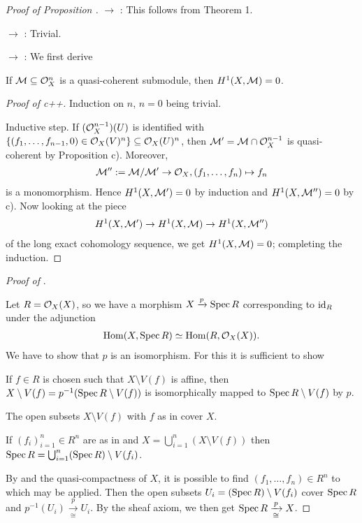 \documentclass[a4paper,parskip=half,numbers=enddot, DIV=12]{scrreprt}
\begin{document}
\begin{proof}[Proof of Proposition ]
 $\rightarrow$ : This follows from Theorem 1.

 $\rightarrow$ : Trivial.

 $\rightarrow$ : We first derive
\begin{fact*}[c++]
If $\mathcal{M}\subseteq \mathcal{O}_X^n$ is a quasi-coherent submodule, then $H^1(X,\mathcal{M})=0$.
\end{fact*}
\begin{proof}[Proof of c++]
Induction on $n$, $n=0$ being trivial.

Inductive step. If $(\mathcal{O}_X^{n-1})(U)$ is identified with
$\{(f_1,\dotsc,f_{n-1},0) \in \mathcal{O}_X(V)^n\} \subseteq \mathcal{O}_X(U)^n$, then
$\mathcal{M}' = \mathcal{M}\cap \mathcal{O}_X^{n-1}$ is quasi-coherent by Proposition  c).
Moreover, \begin{align*}\mathcal{M}'' := \mathcal{M}/\mathcal{M}'\rightarrow \mathcal{O}_X, (f_1,\dotsc,f_n)\mapsto f_n\end{align*}
is a monomorphism. Hence $H^1(X,\mathcal{M}')=0$ by induction and $H^1(X,\mathcal{M}'')=0$ by c). 
Now looking at the piece
\begin{align*}
H^1(X,\mathcal{M}')\rightarrow H^1(X,\mathcal{M})\rightarrow H^1(X,\mathcal{M}'')
\end{align*}
of the long exact cohomology sequence, we get $H^1(X,\mathcal{M})=0$; completing the induction.
\let\oldqed\qedsymbol
\def\qedsymbol{\oldqed{} \emph{for c++}}
\end{proof}
\emph{Proof of }.

Let $R=\mathcal{O}_X(X)$, so we have a morphism $X\xrightarrow p\operatorname{Spec} R$ corresponding to $\operatorname{id}_R$
under the adjunction
\begin{align*}
\operatorname{Hom}(X,\operatorname{Spec} R) \simeq \operatorname{Hom}(R,\mathcal{O}_X(X)).
\end{align*}
We have to show that $p$ is an isomorphism. For this it is sufficient to show
\begin{alphanumerate}
	\item[\itememph{\alpha}] If $f\in R$ is chosen such that $X\setminus V(f)$ is affine, then $X\setminus V(f) = p^{-1}(\operatorname{Spec} R\setminus V(f))$
	is isomorphically mapped to $\operatorname{Spec} R\setminus V(f)$ by $p$.
	\item[\itememph{\beta}] The open subsets $X\setminus V(f)$ with $f$ as in \itememph{\alpha} cover $X$.
	\item[\itememph{\gamma}] If $(f_i)_{i=1}^n \in R^n$ are as in \itememph{\alpha} and $X=\bigcup_{i=1}^n (X\setminus V(f))$ then
$\operatorname{Spec} R = \bigcup_{i=1}^n (\operatorname{Spec} R)\setminus V(f_i)$.
\end{alphanumerate}
By \itememph{\beta} and the quasi-compactness of $X$, it is possible to find
$(f_1,\dotsc,f_n)\in R^n$ to which \itememph{\gamma} may be applied. Then the open subsets
$U_i = (\operatorname{Spec} R)\setminus V(f_i)$ cover $\operatorname{Spec} R$
and $p^{-1}(U_i) \xrightarrow[\cong]p U_i$. By the sheaf axiom, we then get
$\operatorname{Spec} R\xrightarrow[\cong]p X$.


\end{proof}
\end{document}
